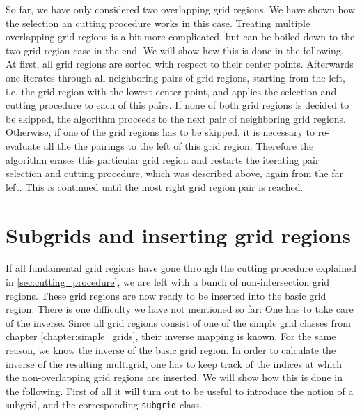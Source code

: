 So far, we have only considered two overlapping grid regions. We have shown how the selection an cutting procedure works in this case. Treating multiple overlapping grid regions is a bit more complicated, but can be boiled down to the two grid region case in the end. We will show how this is done in the following. At first, all grid regions are sorted with respect to their center points. Afterwards one iterates through all neighboring pairs of grid regions, starting from the left, i.e. the grid region with the lowest center point, and applies the selection and cutting procedure to each of this pairs. If none of both grid regions is decided to be skipped, the algorithm proceeds to the next pair of neighboring grid regions. Otherwise, if one of the grid regions has to be skipped, it is necessary to re-evaluate all the the pairings to the left of this grid region. Therefore the algorithm erases this particular grid region and restarts the iterating pair selection and cutting procedure, which was described above, again from the far left. This is continued until the most right grid region pair is reached.



\section{Subgrids and inserting grid regions}\label{sec:subgrids_and_insert}
If all fundamental grid regions have gone through the cutting procedure explained in \ref{sec:cutting_procedure}, we are left with a bunch of non-intersection grid regions. These grid regions are now ready to be inserted into the basic grid region. There is one difficulty we have not mentioned so far: One has to take care of the inverse. Since all grid regions consist of one of the simple grid classes from chapter \ref{chapter:simple_grids}, their inverse mapping is known. For the same reason, we know the inverse of the basic grid region. In order to calculate the inverse of the resulting multigrid, one has to keep track of the indices at which the non-overlapping grid regions are inserted. We will show how this is done in the following. First of all it will turn out to be useful to introduce the notion of a subgrid, and the corresponding \texttt{subgrid} class. 

